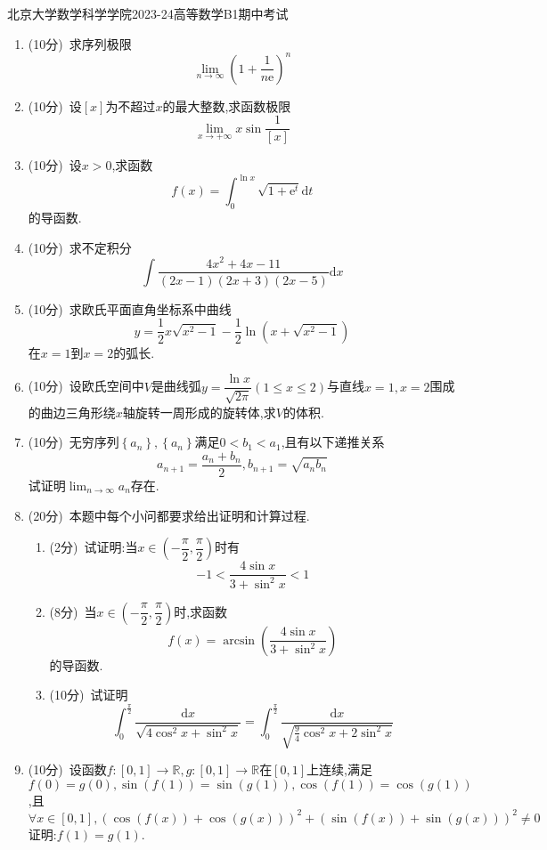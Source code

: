 \documentclass{ctexart}
\newcommand{\e}{\mathrm{e}}
\newcommand{\di}{\mathrm{d}}
\newcommand{\R}{\mathbb{R}}
\newcommand{\dx}{\di x}
\begin{document}
\pagestyle{empty}
\begin{center}\Large
    北京大学数学科学学院2023-24高等数学B1期中考试
\end{center}
\begin{enumerate}[leftmargin=*,label=\textbf{\arabic*.}]
    \item (10分)\ 求序列极限$$\lim_{n\to\infty}{\left(1+\dfrac{1}{n\e}\right)^n}$$
    \item (10分)\ 设$[x]$为不超过$x$的最大整数,求函数极限$$\lim_{x\to+\infty}{x\sin{\dfrac{1}{[x]}}}$$
    \item (10分)\ 设$x>0$,求函数$$f(x)=\int_{0}^{\ln{x}}{\sqrt{1+\e^t}\di t}$$的导函数.
    \item (10分)\ 求不定积分$$\int{\dfrac{4x^2+4x-11}{(2x-1)(2x+3)(2x-5)}\dx}$$
    \item (10分)\ 求欧氏平面直角坐标系中曲线$$y=\dfrac{1}{2}x\sqrt{x^2-1}-\dfrac{1}{2}\ln{\left(x+\sqrt{x^2-1}\right)}$$在$x=1$到$x=2$的弧长.
    \item (10分)\ 设欧氏空间中$V$是曲线弧$\displaystyle y=\dfrac{\ln{x}}{\sqrt{2\pi}}(1\leqslant x\leqslant 2)$与直线$x=1,x=2$围成的曲边三角形绕$x$轴旋转一周形成的旋转体,求$V$的体积.
    \item (10分)\ 无穷序列$\left\{a_n\right\},\left\{a_n\right\}$满足$0<b_1<a_1$,且有以下递推关系$$a_{n+1}=\dfrac{a_n+b_n}{2},b_{n+1}=\sqrt{a_nb_n}$$试证明$\displaystyle\lim_{n\to\infty}{a_n}$存在.
    \item (20分)\ 本题中每个小问都要求给出证明和计算过程.
        \begin{enumerate}[label=\textbf{(\arabic*)}]
            \item (2分)\ 试证明:当$x\in\left(-\dfrac{\pi}{2},\dfrac{\pi}{2}\right)$时有$$-1<\dfrac{4\sin{x}}{3+\sin^2{x}}<1$$
            \item (8分)\ 当$x\in\left(-\dfrac{\pi}{2},\dfrac{\pi}{2}\right)$时,求函数$$f(x)=\arcsin{\left(\dfrac{4\sin{x}}{3+\sin^2{x}}\right)}$$的导函数.
            \item (10分)\ 试证明$$\int_{0}^{\frac{\pi}{2}}{\dfrac{\dx}{\sqrt{4\cos^2{x}+\sin^2{x}}}}=\int_{0}^{\frac{\pi}{2}}{\dfrac{\dx}{\sqrt{\frac{9}{4}\cos^2{x}+2\sin^2{x}}}}$$
        \end{enumerate}
    \item (10分)\ 设函数$f:[0,1]\to\R,g:[0,1]\to\R$在$[0,1]$上连续,满足$f(0)=g(0),\sin(f(1))=\sin(g(1)),\cos(f(1))=\cos(g(1))$,且
                  $$\forall x\in[0,1],\left(\cos(f(x))+\cos(g(x))\right)^2+\left(\sin(f(x))+\sin(g(x))\right)^2\neq 0$$
                  证明:$f(1)=g(1)$.
\end{enumerate}
\end{document}
